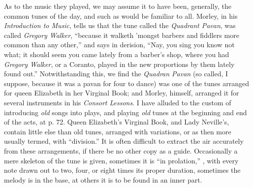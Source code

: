 As to the music they played, we may assume it to have been, generally,
the common tunes of the day, and such as would be familiar to all. Morley, in
his \textit{Introduction to Music}, tells us that the tune called the \textit{Quadrant Pavan}, was
called \textit{Gregory Walker}, “because it walketh ’mongst barbers and fiddlers more
common than any other,” and says in derision, “Nay, you sing you know not
what; it should seem you came lately from a barber’s shop, where you had
\textit{Gregory Walker}, or a Coranto, played in the new proportions by them lately found
out.” Notwithstanding this, we find the \textit{Quadran Pavan} (so called, I suppose,
because it was a pavan for four to dance) was one of the tunes arranged for
queen Elizabeth in her Virginal Book; \pagebreak and Morley, himself, arranged it for
several instruments in his \textit{Consort Lessons}. I have alluded to the custom of
introducing \textit{old} songs into plays, and playing \textit{old} tunes at the beginning and end
of the acts, at p. 72. Queen Elizabeth’s Virginal Book, and Lady Neville’s,
contain little else than old tunes, arranged with variations, or as then more
usually termed, with “division.” It is often difficult to extract the air accurately
from these arrangements, if there be no other copy as a guide. Occasionally
a mere skeleton of the tune is given, sometimes it is “in prolation,” \ie, with
every note drawn out to two, four, or eight times its proper duration, sometimes
the melody is in the base, at others it is to be found in an inner part.

